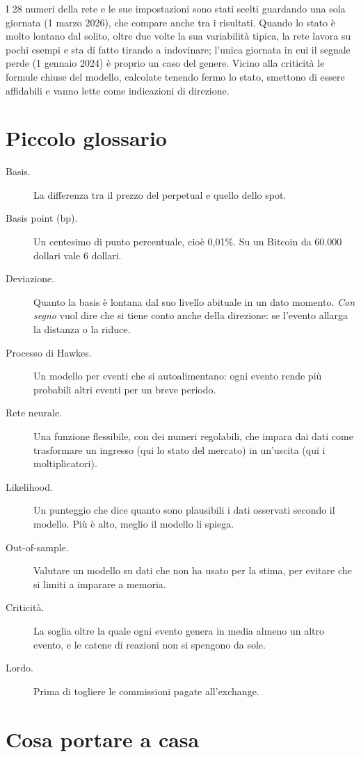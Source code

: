 \documentclass[a4paper,11pt]{article}
\begin{document}
I 28 numeri della rete e le sue impostazioni sono stati scelti guardando una sola giornata (1 marzo 2026), che compare anche tra i risultati. Quando lo stato è molto lontano dal solito, oltre due volte la sua variabilità tipica, la rete lavora su pochi esempi e sta di fatto tirando a indovinare; l'unica giornata in cui il segnale perde (1 gennaio 2024) è proprio un caso del genere. Vicino alla criticità le formule chiuse del modello, calcolate tenendo fermo lo stato, smettono di essere affidabili e vanno lette come indicazioni di direzione.

\section*{Piccolo glossario}

\begin{description}
\item[Basis.] La differenza tra il prezzo del perpetual e quello dello spot.
\item[Basis point (bp).] Un centesimo di punto percentuale, cioè 0,01\%. Su un Bitcoin da 60.000 dollari vale 6 dollari.
\item[Deviazione.] Quanto la basis è lontana dal suo livello abituale in un dato momento. \emph{Con segno} vuol dire che si tiene conto anche della direzione: se l'evento allarga la distanza o la riduce.
\item[Processo di Hawkes.] Un modello per eventi che si autoalimentano: ogni evento rende più probabili altri eventi per un breve periodo.
\item[Rete neurale.] Una funzione flessibile, con dei numeri regolabili, che impara dai dati come trasformare un ingresso (qui lo stato del mercato) in un'uscita (qui i moltiplicatori).
\item[Likelihood.] Un punteggio che dice quanto sono plausibili i dati osservati secondo il modello. Più è alto, meglio il modello li spiega.
\item[Out-of-sample.] Valutare un modello su dati che non ha usato per la stima, per evitare che si limiti a imparare a memoria.
\item[Criticità.] La soglia oltre la quale ogni evento genera in media almeno un altro evento, e le catene di reazioni non si spengono da sole.
\item[Lordo.] Prima di togliere le commissioni pagate all'exchange.
\end{description}

\section*{Cosa portare a casa}
\end{document}
